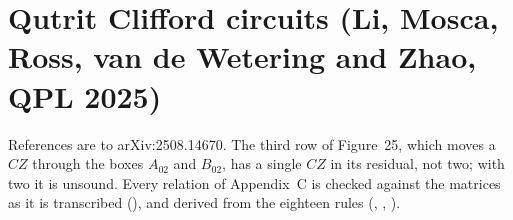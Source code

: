 \documentclass[11pt]{article}
\begin{document}
\section{Qutrit Clifford circuits (Li, Mosca, Ross, van de Wetering and Zhao, QPL 2025)}

References are to arXiv:2508.14670. The third row of Figure~25, which
moves a $CZ$ through the boxes $A_{02}$ and $B_{02}$, has a single $CZ$
in its residual, not two; with two it is unsound. Every relation of
Appendix~C is checked against the matrices as it is transcribed
(), and derived from the eighteen rules
(, , ).
\end{document}
